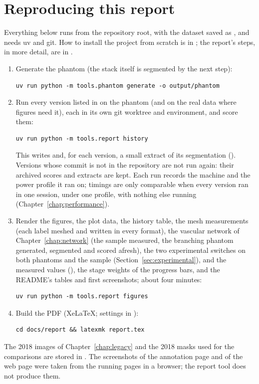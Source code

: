 \chapter{Reproducing this report}
\label{chap:reproduce}

Everything below runs from the repository root, with the dataset saved as
, and needs uv and git. How to install the project from scratch is in
; the report's steps, in more detail, are in .

\begin{enumerate}
  \item Generate the phantom (the stack itself is segmented by the next step):
\begin{verbatim}
uv run python -m tools.phantom generate -o output/phantom
\end{verbatim}
  \item Run every version listed in  on the phantom (and on the real
        data where figures need it), each in its own git worktree and environment, and score them:
\begin{verbatim}
uv run python -m tools.report history
\end{verbatim}
        This writes  and, for each version, a small extract of its
        segmentation (). Versions whose commit is not in the repository
        are not run again: their archived scores and extracts are kept. Each run records the machine
        and the power profile it ran on; timings are only comparable when every version ran in one
        session, under one profile, with nothing else running (Chapter~\ref{chap:performance}).
  \item Render the figures, the plot data, the history table, the mesh measurements (each label
        meshed and written in every format), the vascular network of Chapter~\ref{chap:network} (the
        sample measured, the branching phantom generated, segmented and scored afresh), the two
        experimental switches on both phantoms and the sample (Section~\ref{sec:experimental}), and
        the measured values (), the stage weights of the progress bars, and the README's
        tables and first screenshots; about four minutes:
\begin{verbatim}
uv run python -m tools.report figures
\end{verbatim}
  \item Build the PDF (XeLaTeX; settings in ):
\begin{verbatim}
cd docs/report && latexmk report.tex
\end{verbatim}
\end{enumerate}

The 2018 images of Chapter~\ref{chap:legacy} and the 2018 masks used for the comparisons are stored
in .
The screenshots of the annotation page and of the web page were taken from the running pages in a
browser; the report tool does not produce them.
